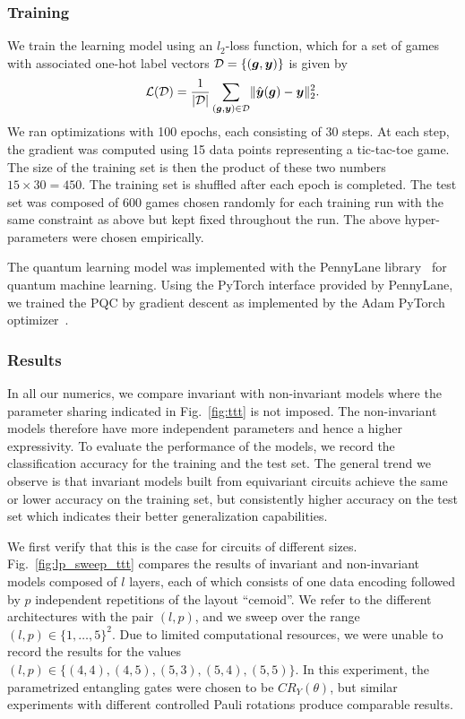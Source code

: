 \documentclass[a4paper,twocolumn,notitlepage,nofootinbib,superscriptaddress,floatfix]{revtex4-2}
\renewcommand{\gg}{\boldsymbol{g}}
\begin{document}
\subsubsection*{Training}

We train the learning model using an $l_2$-loss function, which for a set of games with associated one-hot label vectors $\calD = \{ (\gg, \yy) \}$ is given by
\begin{align}
    \calL(\calD)  = \frac{1}{|\calD|}\sum_{(\gg, \yy) \in \calD} \lVert \hat{\yy}(\gg) - \yy \rVert_2^2.
\end{align}
We ran optimizations with 100 epochs, each consisting of 30 steps. At each step, the gradient was computed using 15 data points representing a tic-tac-toe game. The size of the training set is then the product of these two numbers $15\times 30 = 450$. The training set is shuffled after each epoch is completed.
The test set was composed of 600 games chosen randomly for each training run with the same constraint as above but kept fixed throughout the run. 
The above hyper-parameters were chosen empirically. 

The quantum learning model was implemented with the PennyLane library~\cite{bergholm2020pennylane} for quantum machine learning. Using the PyTorch interface provided by PennyLane, we trained the PQC by gradient descent as implemented by the Adam PyTorch optimizer~\cite{NEURIPS2019_9015}.

\subsubsection*{Results}

In all our numerics, we compare invariant with non-invariant models where the parameter sharing indicated in Fig.~\ref{fig:ttt} is not imposed. The non-invariant models therefore have more independent parameters and hence a higher expressivity.
To evaluate the performance of the models, we record the classification accuracy for the training and the test set.
The general trend we observe is that invariant models built from equivariant circuits achieve the same or lower accuracy on the training set, but consistently higher accuracy on the test set which indicates their better generalization capabilities.

We first verify that this is the case for circuits of different sizes.
Fig.~\ref{fig:lp_sweep_ttt} compares the results of invariant and non-invariant models composed of $l$ layers, each of which consists of one data encoding followed by $p$ independent repetitions of the layout \enquote{cemoid}.
We refer to the different architectures with the pair $(l,p)$, and we sweep over the range $(l,p)\in\{1,\dots,5\}^2$.
Due to limited computational resources, we were unable to record the results for the values {$(l,p)\in\{(4,4), (4,5), (5,3), (5,4), (5,5)\}$}.
In this experiment, the parametrized entangling gates were chosen to be $CR_Y(\theta)$, but similar experiments with different controlled Pauli rotations produce comparable results.
\end{document}
